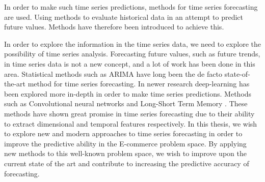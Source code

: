 In order to make such time series predictions, methods for time series forecasting are used.
Using methods to evaluate historical data in an attempt to predict future values.
Methods have therefore been introduced to achieve this.


\iffalse



  In order to explore the information in the time series data, we need to explore the possibility of time series analysis.
  Forecasting future values, such as future trends, in time series data is not a new concept, and a lot of work has been done in this area.
  Statistical methods such as ARIMA have long been the de facto state-of-the-art method for time series forecasting.
  In newer research deep-learning has been explored more in-depth in order to make time series predictions.
  Methods such as Convolutional neural networks  and Long-Short Term Memory .
  These methods have shown great promise in time series forecasting due to their ability to extract dimensional and temporal features respectively.
  In this thesis, we wish to explore new and modern approaches to time series forecasting in order to improve the predictive ability in the E-commerce problem space.
  By applying new methods to this well-known problem space, we wish to improve upon the current state of the art and contribute to increasing the predictive accuracy of forecasting.


